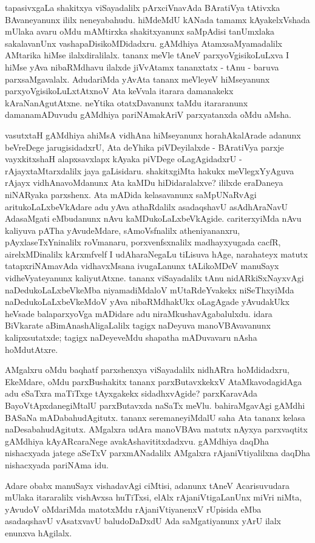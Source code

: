 tapasivxgaLa shakitxya viSayadalilx pArxciVnavAda BAratiVya tAtivxka BAvaneyanunx ililx neneyabahudu. hiMdeMdU kANada tamamx kAyakelxVshada mUlaka avaru oMdu mAMtirxka shakitxyanunx saMpAdisi tanUmxlaka sakalavanUnx vashapaDisikoMDidadxru. gAMdhiya AtamxsaMyamadalilx AMtarika hiMse ilalxdiralilalx. tananx meVle tAneV parxyoVgisikoLuLxva I hiMse yAva nibaRMdhavu ilalxde jiVvAtamx tananxtatx - tAnu - baruva parxsaMgavalalx. AdudariMda yAvAta tananx meVleyeV hiMseyanunx parxyoVgisikoLuLxtAtxnoV Ata keVvala itarara damanakekx kAraNanAgutAtxne. neYtika otatxDavanunx taMdu itararanunx damanamADuvudu gAMdhiya pariNAmakAriV parxyatanxda oMdu aMsha.

vasutxtaH gAMdhiya ahiMsA vidhAna hiMseyanunx horahAkalArade adanunx beVreDege jarugisidadxrU, Ata deYhika piVDeyilalxde - BAratiVya parxje vayxkitxshaH alapxsavxlapx kAyaka piVDege oLagAgidadxrU - rAjayxtaMtarxdalilx jaya gaLisidaru. shakitxgiMta hakukx meVlegxYyAguva rAjayx vidhAnavoMdanunx Ata kaMDu hiDidaralalxve? ililxde eraDaneya niNARyaka parxshenx. Ata mADida kelasavanunx saMpUNaRvAgi aritukoLaLxbeVkAdare adu yAva athaRdalilx asadaqshavU asAdhAraNavU AdasaMgati eMbudanunx nAvu kaMDukoLaLxbeVkAgide. cariterxyiMda nAvu kaliyuva pATha yAvudeMdare, sAmoVsfnalilx atheniyananxru, pAyxlaseTxYninalilx roVmanaru, porxvenfsxnalilx madhayxyugada cacfR, airelxMDinalilx kArxmfvelf I udAharaNegaLu tiLisuva hAge, narahateyx matutx tatapxriNAmavAda vidhavxMsana ivugaLanunx tALikoMDeV manuSayx vidheVyateyanunx kaliyutAtxne. tananx viSayadalilx tAnu nidARkiSxNayxvAgi naDedukoLaLxbeVkeMba niyamadiMdaloV mUtaRdeYvakekx niSeThxyiMda naDedukoLaLxbeVkeMdoV yAva nibaRMdhakUkx oLagAgade yAvudakUkx heVsade balaparxyoVga mADidare adu niraMkushavAgabalulxdu. idara BiVkarate aBimAnashAligaLalilx tagigx naDeyuva manoVBAvavanunx kalipxsutatxde; tagigx naDeyeveMdu shapatha mADuvavaru nAsha hoMdutAtxre.

AMgalxru oMdu baqhatf parxshenxya viSayadalilx nidhARra hoMdidadxru, EkeMdare, oMdu parxBushakitx tananx parxButavxkekxV AtaMkavodagidAga adu eSaTxra maTiTxge tAyxgakekx sidadhx\-vAgide? parxKaravAda BayoVtApxdanegiMtalU parxButavxda naSaTx meVlu. bahiraMgavAgi gAMdhi BASaNa mADabahudAgitutx. tananx seremaneyiMdalU saha Ata tananx kelasa naDesabahudAgitutx. AMgalxra udAra manoVBAva matutx nAyxya parxvaqtitx gAMdhiya kAyARcaraNege avakAshavititxdadxvu. gAMdhiya daqDha nishacxyada jatege aSeTxV parxmANadalilx AMgalxra rAjaniVtiyalilxna daqDha nishacxyada pariNAma idu.

Adare obabx manuSayx vishadavAgi ciMtisi, adanunx tAneV Acarisuvudara mUlaka itararalilx vishAvxsa huTiTxsi, elAlx rAjaniVtigaLanUnx miVri niMta, yAvudoV oMdariMda matotxMdu rAjaniVtiyanenxV rUpisida eMba asadaqshavU vAsatxvavU baludoDaDxdU Ada saMgatiyanunx yArU ilalx enunxva hAgilalx.

